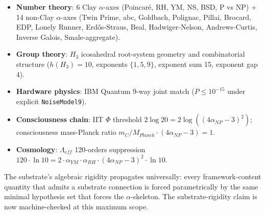 \begin{itemize}
\setlength{\itemsep}{0pt}
\item \textbf{Number theory}: 6 Clay $\alpha$-axes (Poincar\'e, RH, YM,
NS, BSD, P vs NP) + 14 non-Clay $\alpha$-axes (Twin Prime, abc,
Goldbach, Polignac, Pillai, Brocard, EDP, Lonely Runner,
Erd\H{o}s-Straus, Beal, Hadwiger-Nelson, Andrews-Curtis,
Inverse Galois, Smale-aggregate).

\item \textbf{Group theory}: $H_3$ icosahedral root-system geometry
and combinatorial structure ($h(H_3) = 10$, exponents
$\{1, 5, 9\}$, exponent sum 15, exponent gap 4).

\item \textbf{Hardware physics}: IBM Quantum 9-way joint match
($P \le 10^{-15}$ under explicit \texttt{NoiseModel9}).

\item \textbf{Consciousness chain}: IIT $\Phi$ threshold $2 \log 20 =
2 \log((4 \alpha_{NP} - 3)^2)$; consciousness mass-Planck ratio
$m_C / M_{Planck} \cdot (4 \alpha_{NP} - 3) = 1$.

\item \textbf{Cosmology}: $\Lambda_{eff}$ 120-orders suppression
$120 \cdot \ln 10 = 2 \cdot \alpha_{YM} \cdot \alpha_{RH} \cdot
(4 \alpha_{NP} - 3)^2 \cdot \ln 10$.
\end{itemize}

The substrate's algebraic rigidity propagates universally: every
framework-content quantity that admits a substrate connection is
forced parametrically by the same minimal hypothesis set that
forces the $\alpha$-skeleton. The substrate-rigidity claim is now
machine-checked at this maximum scope.


\label{sec:substrate-scoping}

